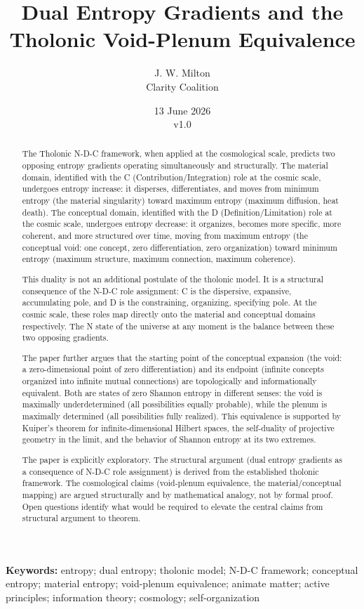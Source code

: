 \documentclass[12pt]{article}
\title{Dual Entropy Gradients and the Tholonic Void-Plenum Equivalence}
\author{J. W. Milton\\[4pt]{\small Clarity Coalition}}
\date{\small 13 June 2026 \\ v1.0}
\begin{document}
\maketitle

\noindent\textbf{Keywords:} entropy; dual entropy; tholonic model; N-D-C framework; conceptual entropy; material entropy; void-plenum equivalence; animate matter; active principles; information theory; cosmology; self-organization

\begin{abstract}
The Tholonic N-D-C framework, when applied at the cosmological scale,
predicts two opposing entropy gradients operating simultaneously and
structurally. The material domain, identified with the C
(Contribution/Integration) role at the cosmic scale, undergoes entropy
increase: it disperses, differentiates, and moves from minimum entropy
(the material singularity) toward maximum entropy (maximum diffusion,
heat death). The conceptual domain, identified with the D
(Definition/Limitation) role at the cosmic scale, undergoes entropy
decrease: it organizes, becomes more specific, more coherent, and more
structured over time, moving from maximum entropy (the conceptual void:
one concept, zero differentiation, zero organization) toward minimum
entropy (maximum structure, maximum connection, maximum coherence).

This duality is not an additional postulate of the tholonic model. It is
a structural consequence of the N-D-C role assignment: C is the
dispersive, expansive, accumulating pole, and D is the constraining,
organizing, specifying pole. At the cosmic scale, these roles map
directly onto the material and conceptual domains respectively. The N
state of the universe at any moment is the balance between these two
opposing gradients.

The paper further argues that the starting point of the conceptual
expansion (the void: a zero-dimensional point of zero differentiation)
and its endpoint (infinite concepts organized into infinite mutual
connections) are topologically and informationally equivalent. Both are
states of zero Shannon entropy in different senses: the void is
maximally underdetermined (all possibilities equally probable), while
the plenum is maximally determined (all possibilities fully realized).
This equivalence is supported by Kuiper's theorem for
infinite-dimensional Hilbert spaces, the self-duality of projective
geometry in the limit, and the behavior of Shannon entropy at its two
extremes.

The paper is explicitly exploratory. The structural argument (dual
entropy gradients as a consequence of N-D-C role assignment) is derived
from the established tholonic framework. The cosmological claims
(void-plenum equivalence, the material/conceptual mapping) are argued
structurally and by mathematical analogy, not by formal proof. Open
questions identify what would be required to elevate the central claims
from structural argument to theorem.
\end{abstract}
\end{document}
